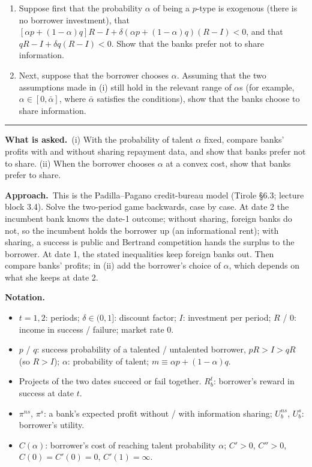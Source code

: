 \documentclass[11pt,a4paper]{article}
\newcommand{\notation}{\par\noindent\textbf{Notation.}}
\newcommand{\asked}{\par\medskip\noindent\textbf{What is asked.}~}
\newcommand{\approach}{\par\smallskip\noindent\textbf{Approach.}~}
\newcommand{\stmtend}{\par\endgroup\nopagebreak\noindent\rule{\linewidth}{0.4pt}\par\medskip}
\begin{document}
\begin{enumerate}
\def\labelenumi{(\roman{enumi})}
\item
  Suppose first that the probability \(\alpha\) of being a \(p\)-type is exogenous (there is no
  borrower investment), that
  \([\alpha p + (1 - \alpha)q]R - I + \delta(\alpha p + (1 - \alpha)q)(R - I) < 0\), and that
  \(qR - I + \delta q(R - I) < 0\). Show that the banks prefer not to share information.
\item
  Next, suppose that the borrower chooses \(\alpha\). Assuming that the two assumptions made in (i)
  still hold in the relevant range of \(\alpha\)s (for example, \(\alpha \in [0, \bar\alpha]\),
  where \(\bar\alpha\) satisfies the conditions), show that the banks choose to share information.
\end{enumerate}
\stmtend

\asked (i) With the probability of talent $\alpha$ fixed, compare banks' profits with and without sharing repayment data, and show that banks prefer not to share. (ii) When the borrower chooses $\alpha$ at a convex cost, show that banks prefer to share.

\approach This is the Padilla--Pagano credit-bureau model (Tirole \S6.3; lecture block 3.4). Solve the two-period game backwards, case by case. At date 2 the incumbent bank knows the date-1 outcome; without sharing, foreign banks do not, so the incumbent holds the borrower up (an informational rent); with sharing, a success is public and Bertrand competition hands the surplus to the borrower. At date 1, the stated inequalities keep foreign banks out. Then compare banks' profits; in (ii) add the borrower's choice of $\alpha$, which depends on what she keeps at date 2.

\notation
\begin{itemize}
  \item $t=1,2$: periods; $\delta\in(0,1]$: discount factor; $I$: investment per period; $R$ / $0$: income in success / failure; market rate 0.
  \item $p$ / $q$: success probability of a talented / untalented borrower, $pR>I>qR$ (so $R>I$); $\alpha$: probability of talent; $m\equiv\alpha p+(1-\alpha)q$.
  \item Projects of the two dates succeed or fail together. $R_b^t$: borrower's reward in success at date $t$.
  \item $\pi^{ns}$, $\pi^s$: a bank's expected profit without / with information sharing; $U_b^{ns}$, $U_b^s$: borrower's utility.
  \item $C(\alpha)$: borrower's cost of reaching talent probability $\alpha$; $C'>0$, $C''>0$, $C(0)=C'(0)=0$, $C'(1)=\infty$.
\end{itemize}
\end{document}
